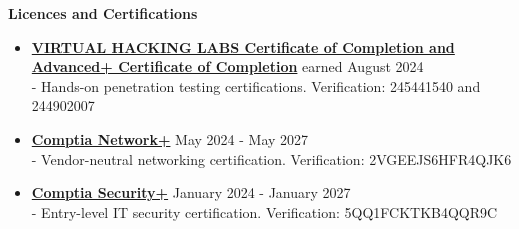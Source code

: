 \documentclass[12pt]{article}
\begin{document}
{{%

\vspace{0.2in} %


\begin{center}
	{\noindent \bfseries Licences and Certifications}
\end{center}

\vspace{0.1pt}

\begin{itemize}[left=0pt, itemsep=1pt] %
    \item {\bfseries \href{https://drive.proton.me/urls/WQCXTSR8C0#8HdkpbN5AP9T}{VIRTUAL HACKING LABS Certificate of Completion \newline and Advanced+ Certificate of Completion}} \hfill earned August 2024 \\[0.04in]
    \hspace*{10pt} - Hands-on penetration testing certifications. \hfill Verification: 245441540 and 244902007
    
\vspace{0.1in}

    \item {\bfseries \href{https://www.credly.com/badges/26299a0a-52db-411c-9df8-f182ff93b8f1/public_url}{Comptia Network+}} \hfill May 2024 - May 2027 \\[0.04in]
    \hspace*{10pt} - Vendor-neutral networking certification. \hfill Verification: 2VGEEJS6HFR4QJK6

\vspace{0.1in}

    \item {\bfseries \href{https://www.credly.com/badges/2c28f48a-77e5-4b3d-b38e-2b2e355a7eec/public_url}{Comptia Security+}} \hfill January 2024 - January 2027 \\[0.04in]
    \hspace*{10pt} - Entry-level IT security certification. \hfill Verification: 5QQ1FCKTKB4QQR9C
\end{itemize}







}}
\end{document}

